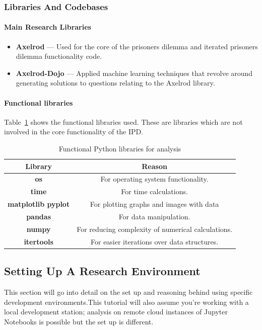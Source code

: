 \subsubsection{Libraries And Codebases}
\paragraph{Main Research Libraries}
\begin{itemize}
    \item \textbf{Axelrod} --- Used for the core of the prisoners dilemma and iterated prisoners dilemma functionality code.
    \item \textbf{Axelrod-Dojo} --- Applied machine learning techniques that revolve around generating solutions to questions relating to the Axelrod library.
\end{itemize}

\paragraph{Functional libraries}
Table~\ref{table:functionalLibrares} shows the functional libraries used.
These are libraries which are not involved in the core functionality of the IPD\@.
\begin{table}[h]
    \centering
    \begin{tabular}{cc}
        \toprule
        Library & Reason\\
        \midrule
        \textbf{os} & For operating system functionality.\\
        \textbf{time} & For time calculations.\\
        \textbf{matplotlib pyplot} & For plotting graphs and images with data\\
        \textbf{pandas} & For data manipulation.\\
        \textbf{numpy} & For reducing complexity of numerical calculations.\\
        \textbf{itertools} & For easier iterations over data structures.\\
        \bottomrule
    \end{tabular}
    \caption{Functional Python libraries for analysis}\label{table:functionalLibrares}
\end{table}

\subsection{Setting Up A Research Environment}\label{subsec:settingUpAResearchEnvironment}
This section will go into detail on the set up and reasoning behind using specific development environments.This tutorial will also assume you're working with a local development station;
analysis on remote cloud instances of Jupyter Notebooks is possible but the set up is different.

